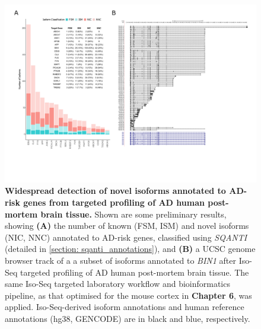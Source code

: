 {\begin{landscape}
	\begin{figure}[!htp]
		\centering
		\includegraphics[page=1,trim={1.5cm 3.5cm 2cm 1cm}, scale = 0.85]{Figures/Bin1_ADBDR.pdf}
		\captionsetup{width=1.5\textwidth}
		\caption[Preliminary results from targeted profiling of human post-mortem brain tissue]%
		{\textbf{Widespread detection of novel isoforms annotated to AD-risk genes from targeted profiling of AD human post-mortem brain tissue.} Shown are some preliminary results, showing \textbf{(A)} the number of known (FSM, ISM) and novel isoforms (NIC, NNC) annotated to AD-risk genes, classified using \textit{SQANTI} (detailed in \cref{section: sqanti_annotations}), and \textbf{(B)} a UCSC genome browser track of a a subset of isoforms annotated to \textit{BIN1} after Iso-Seq targeted profiling of AD human post-mortem brain tissue. The same Iso-Seq targeted laboratory workflow and bioinformatics pipeline, as that optimised for the mouse cortex in \textbf{Chapter 6}, was applied. Iso-Seq-derived isoform annotations and human reference annotations (hg38, GENCODE) are in black and blue, respectively.}   
		\label{fig:adbdr}
	\end{figure}	
\end{landscape}   

}

